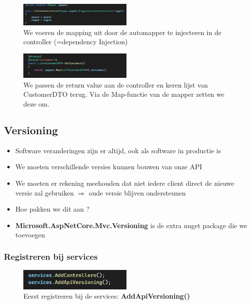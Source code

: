 \documentclass{article}
\begin{document}
\begin{figure}[H]
    \centering
    \includegraphics[width=0.5\textwidth]{dto-inject.png}
    \caption{We voeren de mapping uit door de automapper te injecteren in de controller (=dependency Injection)}
\end{figure}

\begin{figure}[H]
    \centering
    \includegraphics[width=0.5\textwidth]{dto-route.png}
    \caption{We passen de return value aan de controller en keren lijst van CustomerDTO terug. Via de Map-functie van de mapper zetten we deze om.}
\end{figure}


\subsection{Versioning}

\begin{itemize}
    \item Software veranderingen zijn er altijd, ook als software in productie is
    \item We moeten verschillende versies kunnen bouwen van onze API
    \item We moeten er rekening meehouden dat niet iedere client direct de nieuwe versie zal gebruiken $\Rightarrow$ oude versie blijven ondersteunen
    \item Hoe pakken we dit aan ?
    \item \textbf{Microsoft.AspNetCore.Mvc.Versioning} is de extra nuget package die we toevoegen
\end{itemize}

\subsubsection{Registreren bij services}

\begin{figure}[H]
    \centering
    \includegraphics[width=0.5\textwidth]{versioning-services.png}
    \caption{Eerst registreren bij de services: \textbf{AddApiVersioning()}}
\end{figure}
\end{document}
